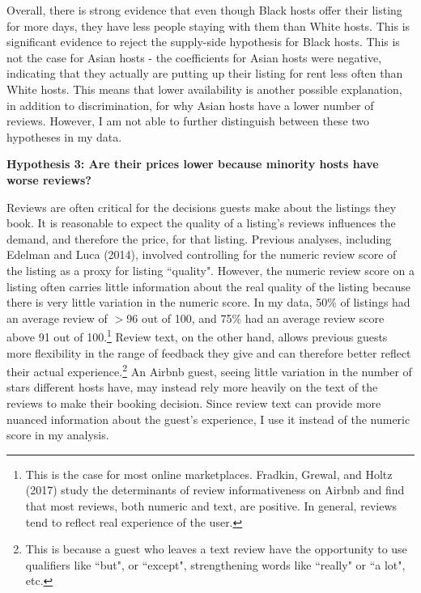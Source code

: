 \documentclass[11pt, oneside]{article}
\begin{document}
Overall, there is strong evidence that even though Black hosts offer their listing for more days, they have less people staying with them than White hosts. This is significant evidence to reject the supply-side hypothesis for Black hosts. This is not the case for Asian hosts - the coefficients for Asian hosts were negative, indicating that they actually are putting up their listing for rent less often than White hosts. This means that lower availability is another possible explanation, in addition to discrimination, for why Asian hosts have a lower number of reviews. However, I am not able to further distinguish between these two hypotheses in my data.  

\textbf{Hypothesis 3: Are their prices lower because minority hosts have worse reviews?} 

Reviews are often critical for the decisions guests make about the listings they book. It is reasonable to expect the quality of a listing's reviews influences the demand, and therefore the price, for that listing. Previous analyses, including Edelman and Luca (2014), involved controlling for the numeric review score of the listing as a proxy for listing ``quality". However, the numeric review score on a listing often carries little information about the real quality of the listing because there is very little variation in the numeric score. In my data, 50\% of listings had an average review of $>$96 out of 100, and 75\% had an average review score above 91 out of 100.\footnote{This is the case for most online marketplaces. Fradkin, Grewal, and Holtz (2017) study the determinants of review informativeness on Airbnb and find that most reviews, both numeric and text, are positive. In general, reviews tend to reflect real experience of the user.\cite{fradkin}} Review text, on the other hand, allows previous guests more flexibility in the range of feedback they give and can therefore better reflect their actual experience.\footnote{This is because a guest who leaves a text review have the opportunity to use qualifiers like ``but", or ``except", strengthening words like ``really" or ``a lot", etc.} An Airbnb guest, seeing little variation in the number of stars different hosts have, may instead rely more heavily on the text of the reviews to make their booking decision. Since review text can provide more nuanced information about the guest's experience, I use it instead of the numeric score in my analysis. 
\end{document}
